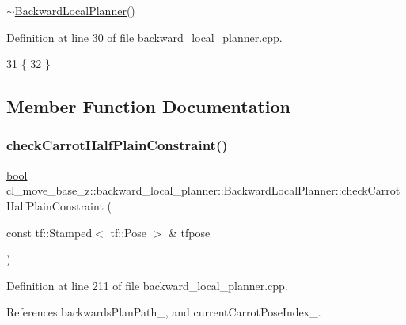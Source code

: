 \hyperlink{classcl__move__base__z_1_1backward__local__planner_1_1BackwardLocalPlanner_a6a36aa94617786c6958e861e64abb862}{$\sim$\+Backward\+Local\+Planner()} 

Definition at line 30 of file backward\+\_\+local\+\_\+planner.\+cpp.


\begin{DoxyCode}
31         \{
32         \}
\end{DoxyCode}


\subsection{Member Function Documentation}
\mbox{\label{classcl__move__base__z_1_1backward__local__planner_1_1BackwardLocalPlanner_a22938e354a4ec489101295ed7f2539f6}} 
\subsubsection{\texorpdfstring{check\+Carrot\+Half\+Plain\+Constraint()}{checkCarrotHalfPlainConstraint()}}
{\footnotesize\ttfamily \hyperlink{classbool}{bool} cl\+\_\+move\+\_\+base\+\_\+z\+::backward\+\_\+local\+\_\+planner\+::\+Backward\+Local\+Planner\+::check\+Carrot\+Half\+Plain\+Constraint (\begin{DoxyParamCaption}\item[{const tf\+::\+Stamped$<$ tf\+::\+Pose $>$ \&}]{tfpose }\end{DoxyParamCaption})\hspace{0.3cm}{\ttfamily [private]}}



Definition at line 211 of file backward\+\_\+local\+\_\+planner.\+cpp.



References backwards\+Plan\+Path\+\_\+, and current\+Carrot\+Pose\+Index\+\_\+.



